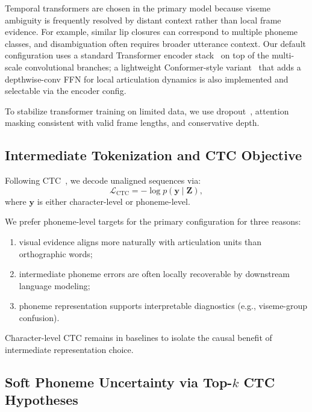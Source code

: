 \documentclass[10pt,twocolumn,letterpaper]{article}
\begin{document}
Temporal transformers are chosen in the primary model because viseme ambiguity is frequently resolved by distant context rather than local frame evidence. For example, similar lip closures can correspond to multiple phoneme classes, and disambiguation often requires broader utterance context. Our default configuration uses a standard Transformer encoder stack~\cite{vaswani2017attention} on top of the multi-scale convolutional branches; a lightweight Conformer-style variant~\cite{conformer2020} that adds a depthwise-conv FFN for local articulation dynamics is also implemented and selectable via the encoder config.

To stabilize transformer training on limited data, we use dropout~\cite{srivastava2014dropout}, attention masking consistent with valid frame lengths, and conservative depth.

\subsection{Intermediate Tokenization and CTC Objective}
Following CTC~\cite{graves2006ctc}, we decode unaligned sequences via:
\begin{equation}
\mathcal{L}_{\text{CTC}} = -\log p(\mathbf{y}\mid \mathbf{Z}),
\end{equation}
where $\mathbf{y}$ is either character-level or phoneme-level.

We prefer phoneme-level targets for the primary configuration for three reasons:
\begin{enumerate}[leftmargin=*]
    \item visual evidence aligns more naturally with articulation units than orthographic words;
    \item intermediate phoneme errors are often locally recoverable by downstream language modeling;
    \item phoneme representation supports interpretable diagnostics (e.g., viseme-group confusion).
\end{enumerate}

Character-level CTC remains in baselines to isolate the causal benefit of intermediate representation choice.

\subsection{Soft Phoneme Uncertainty via Top-$k$ CTC Hypotheses}
\end{document}
